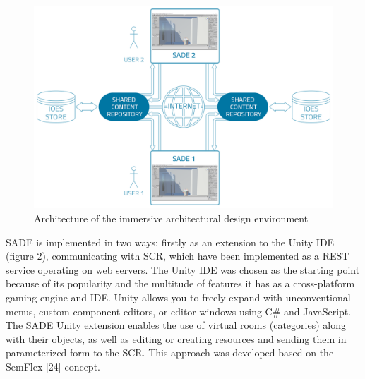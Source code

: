 \documentclass[runningheads]{llncs}
\begin{document}
\begin{figure}[H]
\centering
\includegraphics[width=\textwidth]{graf2.png}
\caption{Architecture of the immersive architectural design environment} \label{fig2}
\end{figure}
SADE is implemented in two ways: firstly as an extension to the Unity IDE (figure 2), communicating with SCR, which have been implemented as a REST service operating on web servers. The Unity IDE was chosen as the starting point because of its popularity and the multitude of features it has as a cross-platform gaming engine and IDE. Unity allows you to freely expand with unconventional menus, custom component editors, or editor windows using C\# and JavaScript. The SADE Unity extension enables the use of virtual rooms (categories) along with their objects, as well as editing or creating resources and sending them in parameterized form to the SCR. This approach was developed based on the SemFlex [24] concept.
\end{document}
